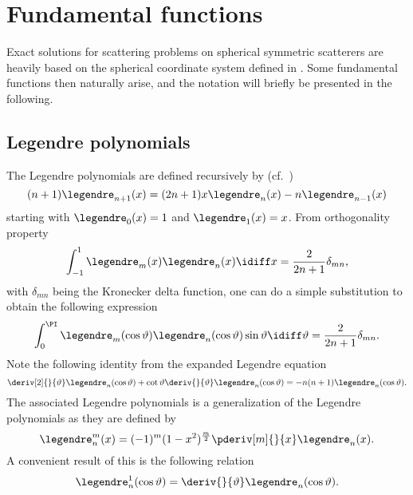 \section{Fundamental functions}
Exact solutions for scattering problems on spherical symmetric scatterers are heavily based on the spherical coordinate system defined in . Some fundamental functions then naturally arise, and the notation will briefly be presented in the following.

\subsection{Legendre polynomials}
\label{subsec:legendre}
The Legendre polynomials are defined recursively by (cf.~\cite[p. 332]{Abramowitz1965hom})
\begin{equation}
	(n+1)\legendre_{n+1}(x)=(2n+1)x\legendre_n(x)-n\legendre_{n-1}(x)
\end{equation}
starting with $\legendre_0(x) = 1$ and $\legendre_1(x) = x$. From orthogonality property~\cite[\href{http://functions.wolfram.com/05.03.21.0006.01}{05.03.21.0006.01}]{WolframResearch2016m}
\begin{equation}
	\int_{-1}^1 \legendre_m(x)\legendre_n(x)\idiff x = \frac{2}{2n+1}\delta_{mn},
\end{equation}
with $\delta_{mn}$ being the Kronecker delta function, one can do a simple substitution to obtain the following expression
\begin{equation}\label{Eq1:legendreOrthogonality}
	\int_0^\PI \legendre_m(\cos\vartheta)\legendre_n(\cos\vartheta)\sin\vartheta\idiff \vartheta = \frac{2}{2n+1}\delta_{mn}.
\end{equation}
Note the following identity from the expanded Legendre equation
\begin{equation}\label{Eq1:expandedLegendreEquationIdentity}
	\deriv[2]{}{\vartheta} \legendre_n(\cos\vartheta) + \cot\vartheta \deriv{}{\vartheta} \legendre_n(\cos\vartheta) = -n(n+1)\legendre_n(\cos\vartheta).
\end{equation}
The associated Legendre polynomials is a generalization of the Legendre polynomials as they are defined by
\begin{equation}
	\legendre_n^m(x) = (-1)^m(1-x^2)^{\frac{m}{2}}\pderiv[m]{}{x} \legendre_n(x).
\end{equation}
A convenient result of this is the following relation
\begin{equation}
	\legendre_n^1(\cos\vartheta) = \deriv{}{\vartheta} \legendre_n(\cos\vartheta)\label{Eq1:LegendreRelation1}.
\end{equation}
